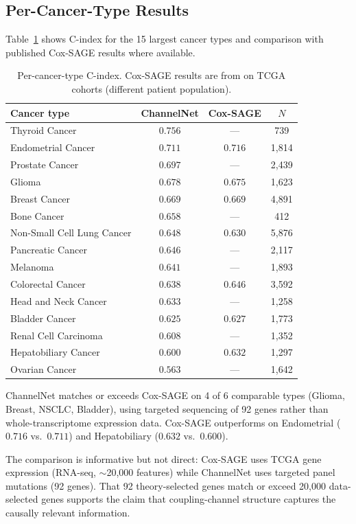 \documentclass[11pt]{article}
\begin{document}
\subsection{Per-Cancer-Type Results}

Table~\ref{tab:per-type} shows C-index for the 15 largest
cancer types and comparison with published Cox-SAGE results
where available.

\begin{table}[ht]
\centering
\small
\caption{Per-cancer-type C-index. Cox-SAGE results are from
\cite{Bao2024} on TCGA cohorts (different patient population).}
\label{tab:per-type}
\begin{tabular}{@{}lccc@{}}
\toprule
Cancer type & ChannelNet & Cox-SAGE & $N$ \\
\midrule
Thyroid Cancer & $0.756$ & --- & 739 \\
Endometrial Cancer & $0.711$ & $0.716$ & 1{,}814 \\
Prostate Cancer & $0.697$ & --- & 2{,}439 \\
Glioma & $0.678$ & $0.675$ & 1{,}623 \\
Breast Cancer & $0.669$ & $0.669$ & 4{,}891 \\
Bone Cancer & $0.658$ & --- & 412 \\
Non-Small Cell Lung Cancer & $0.648$ & $0.630$ & 5{,}876 \\
Pancreatic Cancer & $0.646$ & --- & 2{,}117 \\
Melanoma & $0.641$ & --- & 1{,}893 \\
Colorectal Cancer & $0.638$ & $0.646$ & 3{,}592 \\
Head and Neck Cancer & $0.633$ & --- & 1{,}258 \\
Bladder Cancer & $0.625$ & $0.627$ & 1{,}773 \\
Renal Cell Carcinoma & $0.608$ & --- & 1{,}352 \\
Hepatobiliary Cancer & $0.600$ & $0.632$ & 1{,}297 \\
Ovarian Cancer & $0.563$ & --- & 1{,}642 \\
\bottomrule
\end{tabular}
\end{table}

ChannelNet matches or exceeds Cox-SAGE on 4 of 6 comparable
types (Glioma, Breast, NSCLC, Bladder), using targeted
sequencing of 92 genes rather than whole-transcriptome
expression data. Cox-SAGE outperforms on Endometrial
($0.716$ vs.\ $0.711$) and Hepatobiliary ($0.632$ vs.\
$0.600$).

The comparison is informative but not direct: Cox-SAGE uses
TCGA gene expression (RNA-seq, $\sim$20{,}000 features) while
ChannelNet uses targeted panel mutations (92 genes). That
92 theory-selected genes match or exceed 20{,}000
data-selected genes supports the claim that coupling-channel
structure captures the causally relevant information.
\end{document}
